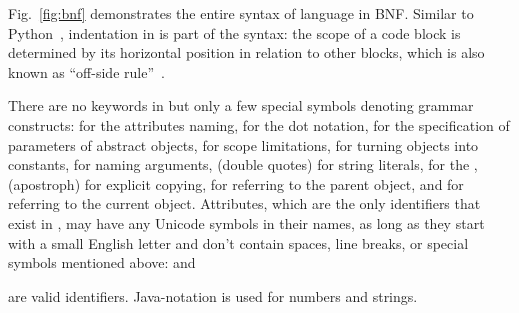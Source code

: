 Fig.~\ref{fig:bnf} demonstrates the entire syntax of \eo{} language in BNF.
Similar to Python~\citep{lutz2013learning}, indentation in \eo{} is part of the syntax:
the scope of a code block is determined by its horizontal position
in relation to other blocks, which is also known as ``off-side rule''~\citep{landin1966next}.

There are no keywords in \eo{} but only a few special symbols
denoting grammar constructs:
  \ff{>} for the attributes naming,
   for the dot notation,
  \ff{[]} for the specification of parameters of abstract objects,
  \ff{()} for scope limitations,
  \ff{!} for turning objects into constants,
  \ff{:} for naming arguments,
   (double quotes) for string literals,
   for the ,
   (apostroph) for explicit copying,
  \ff{\^{}} for referring to the parent object,
  and
  \ff{\$} for referring to the current object.
Attributes, which are the only identifiers that exist in \eo{}, may have
any Unicode symbols in their names, as long as they start with a small English letter
and don't contain spaces, line breaks, or special symbols mentioned above:
 and
\begin{CJK}{UTF8}{gbsn}
\end{CJK}
 are valid identifiers.
Java-notation is used for numbers and strings.

